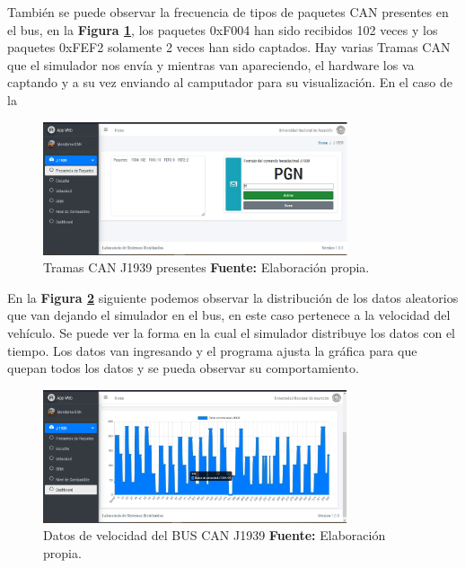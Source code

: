 También se puede observar la frecuencia de tipos de paquetes CAN presentes en el bus, en la \textbf{Figura \ref{paquetes_ref_c6}}, los paquetes 0xF004 han sido recibidos 102 veces y los paquetes 0xFEF2 solamente 2 veces han sido captados. Hay varias Tramas CAN que el simulador nos envía y mientras van apareciendo, el hardware los va captando y a su vez enviando al camputador para su visualización. En el caso de la 


\begin{figure}[H]
	\centering
	\includegraphics[width=0.8\textwidth]{./Cap6imagen/paquetes_fig_c6.png}
	\caption [Tramas CAN J1939 presentes.]{Tramas CAN J1939 presentes \textbf{ Fuente:} %
		Elaboración propia.}
	\label{paquetes_ref_c6} %
\end{figure}




En la \textbf{Figura \ref{real_ref_c6}} siguiente podemos observar la distribución de los datos aleatorios que van dejando el simulador en el bus, en este caso pertenece a la velocidad  del vehículo. Se puede ver la forma en la cual el simulador distribuye los datos con el tiempo.  Los datos van ingresando y el programa ajusta la gráfica para que quepan todos los datos y se pueda observar su comportamiento.  

\begin{figure}[H]
	\centering
	\includegraphics[width=0.8\textwidth]{./Cap6imagen/real_fig_c6.png}
	\caption [Datos de Velocidad del BUS CAN J1939.]{Datos de velocidad del BUS CAN J1939 \textbf{ Fuente:} %
		Elaboración propia.}
	\label{real_ref_c6} %
\end{figure}


